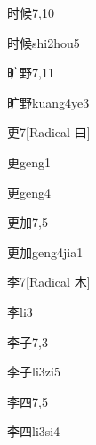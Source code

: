 \begin{entry}{时候}{7,10}
  \begin{phonetics}{时候}{shi2hou5}
  \end{phonetics}
\end{entry}

\begin{entry}{旷野}{7,11}
  \begin{phonetics}{旷野}{kuang4ye3}
  \end{phonetics}
\end{entry}

\begin{entry}{更}{7}[Radical ⽈]
  \begin{phonetics}{更}{geng1}
  \end{phonetics}
  \begin{phonetics}{更}{geng4}
  \end{phonetics}
\end{entry}

\begin{entry}{更加}{7,5}
  \begin{phonetics}{更加}{geng4jia1}
  \end{phonetics}
\end{entry}

\begin{entry}{李}{7}[Radical 木]
  \begin{phonetics}{李}{li3}
  \end{phonetics}
\end{entry}

\begin{entry}{李子}{7,3}
  \begin{phonetics}{李子}{li3zi5}
  \end{phonetics}
\end{entry}

\begin{entry}{李四}{7,5}
  \begin{phonetics}{李四}{li3si4}
  \end{phonetics}
\end{entry}

